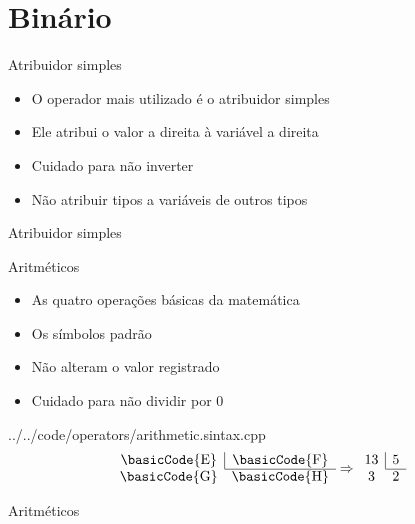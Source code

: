 \documentclass[11pt]{beamer}
\begin{document}
\section{Binário}
	\begin{frame}{Atribuidor simples}
		\begin{itemize}
			\presentationPause\item O operador mais utilizado é o atribuidor simples
			\presentationPause\item Ele atribui o valor a direita à variável a direita
			\presentationPause\item Cuidado para não inverter
			\presentationPause\item Não atribuir tipos a variáveis de outros tipos
		\end{itemize}
		\presentationPause
	\end{frame}\begin{frame}{Atribuidor simples}
		
	\end{frame}

	\begin{frame}{Aritméticos}
		\begin{itemize}
			\presentationPause\item As quatro operações básicas da matemática
			\presentationPause\item Os símbolos padrão
			\presentationPause\item Não alteram o valor registrado
			\presentationPause\item Cuidado para não dividir por 0
		\end{itemize}
		\presentationPause
		{../../code/operators/arithmetic.sintax.cpp}
		\presentationPause\begin{equation}\nonumber
			\begin{array}{cc}
				\text{\basicCode{E}} & \multicolumn{1}{|c}{\text{\basicCode{F}}} \\ \cline{2-2} 
				\text{\basicCode{G}} & \text{\basicCode{H}}
			\end{array} \Rightarrow \begin{array}{cc}
				13 & \multicolumn{1}{|c}{5} \\ \cline{2-2} 
					3 & 2		
			\end{array}
		\end{equation}
	\end{frame}\begin{frame}{Aritméticos}
		
	\end{frame}
\end{document}
